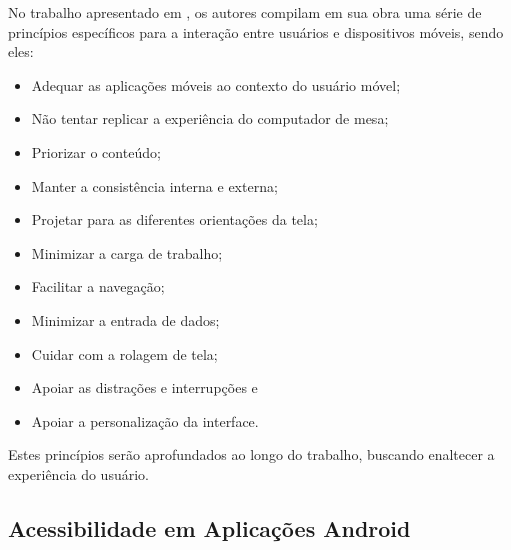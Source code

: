 No trabalho apresentado em \cite{ERGO2015}, os autores compilam em sua obra uma série de princípios específicos para a interação entre usuários e dispositivos móveis, sendo eles:
\begin{itemize}
	\item Adequar as aplicações móveis ao contexto do usuário móvel;
	\item Não tentar replicar a experiência do computador de mesa;
	\item Priorizar o conteúdo;
	\item Manter a consistência interna e externa;
	\item Projetar para as diferentes orientações da tela;
	\item Minimizar a carga de trabalho;
	\item Facilitar a navegação;
	\item Minimizar a entrada de dados;
	\item Cuidar com a rolagem de tela;
	\item Apoiar as distrações e interrupções e
	\item Apoiar a personalização da interface.
\end{itemize}
Estes princípios serão aprofundados ao longo do trabalho, buscando enaltecer a experiência do usuário.


\subsection{Acessibilidade em Aplicações Android}

